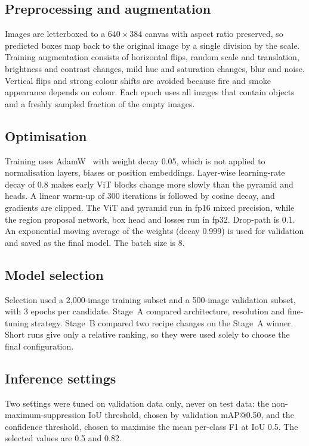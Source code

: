 \documentclass[conference]{IEEEtran}
\begin{document}
\subsection{Preprocessing and augmentation}
Images are letterboxed to a $640\times384$ canvas with aspect ratio preserved, so predicted boxes map back to the original image by a single division by the scale. Training augmentation consists of horizontal flips, random scale and translation, brightness and contrast changes, mild hue and saturation changes, blur and noise. Vertical flips and strong colour shifts are avoided because fire and smoke appearance depends on colour. Each epoch uses all images that contain objects and a freshly sampled fraction of the empty images.

\subsection{Optimisation}
Training uses AdamW~\cite{loshchilov2019adamw} with weight decay 0.05, which is not applied to normalisation layers, biases or position embeddings. Layer-wise learning-rate decay of 0.8 makes early ViT blocks change more slowly than the pyramid and heads. A linear warm-up of 300 iterations is followed by cosine decay, and gradients are clipped. The ViT and pyramid run in fp16 mixed precision, while the region proposal network, box head and losses run in fp32. Drop-path is 0.1. An exponential moving average of the weights (decay 0.999) is used for validation and saved as the final model. The batch size is 8.

\subsection{Model selection}
Selection used a 2{,}000-image training subset and a 500-image validation subset, with 3 epochs per candidate. Stage~A compared architecture, resolution and fine-tuning strategy. Stage~B compared two recipe changes on the Stage~A winner. Short runs give only a relative ranking, so they were used solely to choose the final configuration.

\subsection{Inference settings}
Two settings were tuned on validation data only, never on test data: the non-maximum-suppression IoU threshold, chosen by validation mAP@0.50, and the confidence threshold, chosen to maximise the mean per-class F1 at IoU 0.5. The selected values are 0.5 and 0.82.
\end{document}
